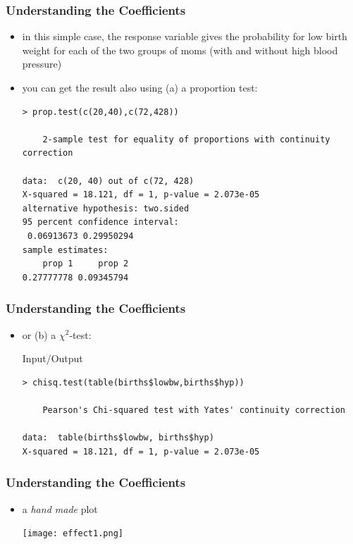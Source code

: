 \begin{frame}[fragile]\frametitle{Understanding the Coefficients}
\begin{itemize}
\item in this simple case, the response variable gives the probability for low birth weight for each of the two groups of moms (with and without high blood pressure)
\item you can get the result also using (a) a proportion test:\small
  \begin{exampleblock}\scriptsize
\begin{verbatim}
> prop.test(c(20,40),c(72,428))

	2-sample test for equality of proportions with continuity correction

data:  c(20, 40) out of c(72, 428)
X-squared = 18.121, df = 1, p-value = 2.073e-05
alternative hypothesis: two.sided
95 percent confidence interval:
 0.06913673 0.29950294
sample estimates:
    prop 1     prop 2 
0.27777778 0.09345794 
\end{verbatim}
  \end{exampleblock}
\end{itemize}
\end{frame}

\begin{frame}[fragile]\frametitle{Understanding the Coefficients}
\begin{itemize}
\item or (b) a $\chi^2$-test:\small
  \begin{exampleblock}{Input/Output}\footnotesize
\begin{verbatim}
> chisq.test(table(births$lowbw,births$hyp))

	Pearson's Chi-squared test with Yates' continuity correction

data:  table(births$lowbw, births$hyp)
X-squared = 18.121, df = 1, p-value = 2.073e-05
\end{verbatim}
  \end{exampleblock}
\end{itemize}
\end{frame}

\begin{frame}[fragile]\frametitle{Understanding the Coefficients}
\begin{itemize}
\item a \emph{hand made} plot
\begin{center}
\texttt{[image: effect1.png]}
\end{center}
\end{itemize}
\end{frame}

